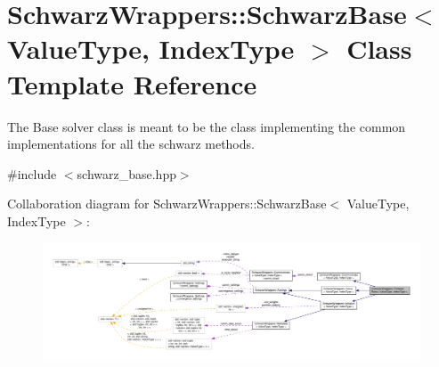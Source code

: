 \hypertarget{classSchwarzWrappers_1_1SchwarzBase}{}\section{Schwarz\+Wrappers\+:\+:Schwarz\+Base$<$ Value\+Type, Index\+Type $>$ Class Template Reference}
\label{classSchwarzWrappers_1_1SchwarzBase}


The Base solver class is meant to be the class implementing the common implementations for all the schwarz methods.  




{\ttfamily \#include $<$schwarz\+\_\+base.\+hpp$>$}



Collaboration diagram for Schwarz\+Wrappers\+:\+:Schwarz\+Base$<$ Value\+Type, Index\+Type $>$\+:
\nopagebreak
\begin{figure}[H]
\begin{center}
\leavevmode
\includegraphics[width=350pt]{classSchwarzWrappers_1_1SchwarzBase__coll__graph}
\end{center}
\end{figure}
